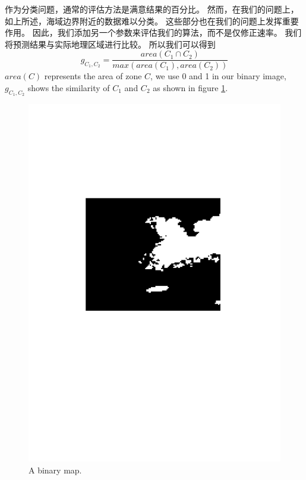 作为分类问题，通常的评估方法是满意结果的百分比。 然而，在我们的问题上，如上所述，海域边界附近的数据难以分类。 这些部分也在我们的问题上发挥重要作用。 因此，我们添加另一个参数来评估我们的算法，而不是仅修正速率。 我们将预测结果与实际地理区域进行比较。 所以我们可以得到
\begin{equation}
g_{C_1, C_2} = \frac{area({C_1\cap C_2})}{max(area({C_1}), area({C_2}))}
\end{equation}
$area(C)$ represents the area of zone $C$, we use 0 and 1 in our binary image, $g_{C_1, C_2}$ shows the similarity of $C_1$ and $C_2$ as shown in figure \ref{fig:binary}.
\begin{figure}
	\centering
	\includegraphics[height=0.25\textheight]{figures/binary}
	\caption{A binary map.}
	\label{fig:binary}
\end{figure}

